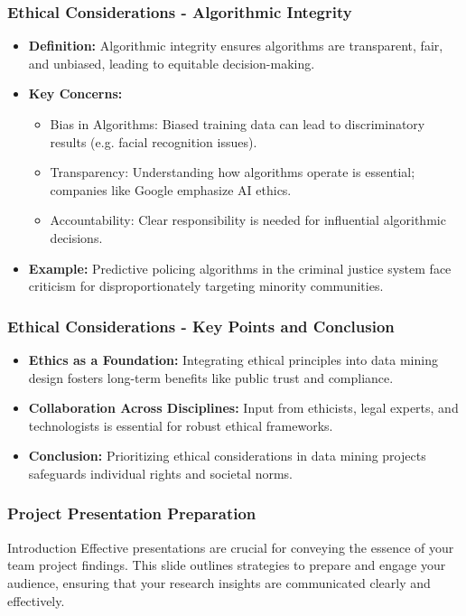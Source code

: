 \documentclass[aspectratio=169]{beamer}
\begin{document}
\begin{frame}[fragile]
    \frametitle{Ethical Considerations - Algorithmic Integrity}
    \begin{itemize}
        \item \textbf{Definition:} 
        Algorithmic integrity ensures algorithms are transparent, fair, and unbiased, leading to equitable decision-making.
        \item \textbf{Key Concerns:}
        \begin{itemize}
            \item Bias in Algorithms: Biased training data can lead to discriminatory results (e.g. facial recognition issues).
            \item Transparency: Understanding how algorithms operate is essential; companies like Google emphasize AI ethics.
            \item Accountability: Clear responsibility is needed for influential algorithmic decisions.
        \end{itemize}
        \item \textbf{Example:} 
        Predictive policing algorithms in the criminal justice system face criticism for disproportionately targeting minority communities.
    \end{itemize}
\end{frame}

\begin{frame}[fragile]
    \frametitle{Ethical Considerations - Key Points and Conclusion}
    \begin{itemize}
        \item \textbf{Ethics as a Foundation:} 
        Integrating ethical principles into data mining design fosters long-term benefits like public trust and compliance.
        \item \textbf{Collaboration Across Disciplines:} 
        Input from ethicists, legal experts, and technologists is essential for robust ethical frameworks.
        \item \textbf{Conclusion:} 
        Prioritizing ethical considerations in data mining projects safeguards individual rights and societal norms.
    \end{itemize}
\end{frame}

\begin{frame}[fragile]
    \frametitle{Project Presentation Preparation}
    \begin{block}{Introduction}
        Effective presentations are crucial for conveying the essence of your team project findings. This slide outlines strategies to prepare and engage your audience, ensuring that your research insights are communicated clearly and effectively.
    \end{block}
\end{frame}
\end{document}
